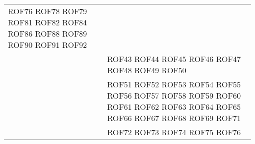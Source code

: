 \documentclass[../DefinizioneDiProdotto.tex]{subfiles}
\begin{document}
\begin{longtable}{p{8.5cm}!{\VRule[1pt]}p{2.5cm}}
ROF76 \newline 
ROF78 \newline 
ROF79 \newline 
ROF81 \newline 
ROF82 \newline 
ROF84 \newline 
ROF86 \newline 
ROF88 \newline 
ROF89 \newline 
ROF90 \newline 
ROF91 \newline 
ROF92 \\
 & ROF43 \newline 
ROF44 \newline 
ROF45 \newline 
ROF46 \newline 
ROF47 \newline 
ROF48 \newline 
ROF49 \newline 
ROF50 \\
 & ROF51 \newline 
ROF52 \newline 
ROF53 \newline 
ROF54 \newline 
ROF55 \newline 
ROF56 \newline 
ROF57 \newline 
ROF58 \newline 
ROF59 \newline 
ROF60 \newline 
ROF61 \newline 
ROF62 \newline 
ROF63 \newline 
ROF64 \newline 
ROF65 \newline 
ROF66 \newline 
ROF67 \newline 
ROF68 \newline 
ROF69 \newline 
ROF71 \\
 & ROF72 \newline 
ROF73 \newline 
ROF74 \newline 
ROF75 \newline 
ROF76 \newline 

\end{longtable}
\end{document}
